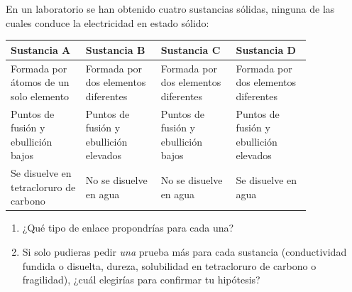 \begin{exercise}
    En un laboratorio se han obtenido cuatro sustancias sólidas, ninguna de las cuales conduce la electricidad en estado sólido:
    \begin{center}
        \begin{tabular}{@{}C{0.21\linewidth} C{0.21\linewidth} C{0.21\linewidth} C{0.21\linewidth}@{}}
            \toprule
            \textbf{Sustancia A} & \textbf{Sustancia B} & \textbf{Sustancia C} & \textbf{Sustancia D} \\
            \midrule
            Formada por átomos de un solo elemento & Formada por dos elementos diferentes & Formada por dos elementos diferentes & Formada por dos elementos diferentes \\[3pt]
            Puntos de fusión y ebullición bajos & Puntos de fusión y ebullición elevados & Puntos de fusión y ebullición bajos & Puntos de fusión y ebullición elevados \\[3pt]
            Se disuelve en tetracloruro de carbono & No se disuelve en agua & No se disuelve en agua & Se disuelve en agua \\
            \bottomrule
        \end{tabular}
    \end{center}
    \begin{enumerate}[label=\alph*)]
        \item ¿Qué tipo de enlace propondrías para cada una?
        \item Si solo pudieras pedir \emph{una} prueba más para cada sustancia (conductividad fundida o disuelta, dureza, solubilidad en tetracloruro de carbono o fragilidad), ¿cuál elegirías para confirmar tu hipótesis?

\end{enumerate}
\end{exercise}
